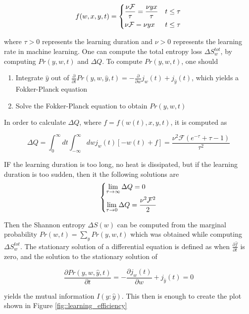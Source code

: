 \begin{equation*}
f(w,x,y,t) = \begin{dcases}
\frac{\nu \mathcal{F}}{\tau} = \frac{\nu y x}{\tau} & t \leq \tau \\
\nu \mathcal{F} = \nu y x  & t \leq \tau
\end{dcases}
\end{equation*}

where $\tau > 0$ represents the learning duration and $\nu > 0$ represents the learning rate in machine learning. One can compute the total entropy loss $\Delta S_w ^{tot}$, by computing $Pr(y,w,t)$ and $\Delta Q$. To compute $Pr(y,w,t)$, one should
\begin{enumerate}
    \item Integrate $\hat{y}$ out of $\frac{\partial}{\partial t} Pr(y,w,\hat{y},t) = -\frac{\partial}{\partial w} j_w(t) + j_{\hat{y}}(t)$, which yields a Fokker-Planck equation
    \item Solve the Fokker-Planck equation to obtain $Pr(y,w,t)$
\end{enumerate}

In order to calculate $\Delta Q$, where $f = f(w(t), x, y, t)$, it is computed as

$$\Delta Q = \int_0^\infty dt \int_{-\infty}^\infty dw j_w(t) [-w(t) + f] = \frac{\nu^2 \mathcal{F} (e^{-\tau}+\tau - 1)}{\tau^2}$$

IF the learning duration is too long, no heat is dissipated, but if the learning duration is too sudden, then it the following solutions are
\begin{equation*}
\begin{dcases}
    \lim_{\tau \rightarrow \infty} \Delta Q = 0 \\
    \lim_{\tau \rightarrow 0} \Delta Q = \frac{\nu^2 \mathcal{F}^2}{2}
\end{dcases}
\end{equation*}

Then the Shannon entropy $\Delta S(w)$ can be computed from the marginal probability $Pr(w,t) = \sum_y Pr(y,w,t)$ which was obtained while computing $\Delta S_w^{tot}$. The stationary solution of a differential equation is defined as when $\frac{\partial \hat{f}}{\partial t}$ is zero, and the solution to the stationary solution of

$$\frac{\partial Pr(y,w,\hat{y},t)}{\partial t} = - \frac{\partial j_w (t)}{\partial w} + j_{\hat{y}}(t) = 0$$

yields the mutual information $I(y:\hat{y})$. This then is enough to create the plot shown in Figure \ref{fig::learning_efficiency}

